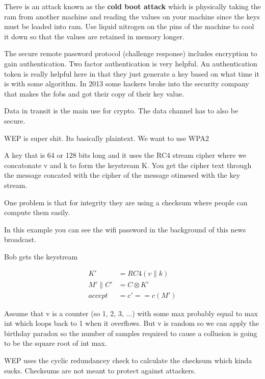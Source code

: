 \documentclass{article}
\begin{document}
There is an attack known as the \textbf{cold boot attack} which is physically taking the ram from another machine and reading the values on your machine since the keys must be loaded into ram. Use liquid nitrogen on the pins of the machine to cool it down so that the values are retained in memory longer. 


The secure remote password protocol (challenge response) includes encryption to gain authentication. Two factor authentication is very helpful. An authentication token is really helpful here in that they just generate a key based on what time it is with some algorithm. In 2013 some hackers broke into the security company that makes the fobs and got their copy of their key value. 


Data in transit is the main use for crypto. The data channel has to also be secure. 



WEP is super shit. Its basically plaintext. We want to use WPA2


A key that is 64 or 128 bits long and it uses the RC4 stream cipher where we concatonate v and k to form the keystream K. You get the cipher text through the message concated with the cipher of the message otimesed with the key stream.

One problem is that for integrity they are using a checksum where people can compute them easily.


In this example you can see the wifi password in the background of this news broadcast.


Bob gets the keystream

\begin{align*}
	K' &= RC4(v \parallel  k)\\
	M'\parallel C' &= C \otimes K'\\
	accept &= c' == c(M')
\end{align*}

Assume that v is a counter (so 1, 2, 3, ...) with some max probably equal to max int which loops back to 1 when it overflows. But v is random so we can apply the birthday paradox so the number of samples required to cause a collusion is going to be the square root of int max.


WEP uses the cyclic redundancey check to calculate the checksum which kinda sucks. Checksums are not meant to protect against attackers.
\end{document}
